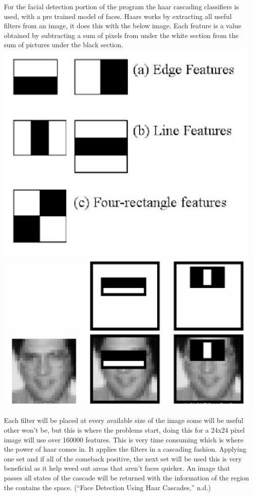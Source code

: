 \documentclass[
  english,
  a4paper,
,tablecaptionabove
]{scrartcl}
\begin{document}
For the facial detection portion of the program the haar cascading
classifiers is used, with a pre trained model of faces. Haars works by
extracting all useful filters from an image, it does this with the below
image. Each feature is a value obtained by subtracting a sum of pixels
from under the white section from the sum of pictures under the black
section. \includegraphics{images/ppm-images/camera-algorithm1.png}
\includegraphics{images/ppm-images/camera-algorithm2.png}

Each filter will be placed at every available size of the image some
will be useful other won't be, but this is where the problems start,
doing this for a 24x24 pixel image will use over 160000 features. This
is very time consuming which is where the power of haar comes in. It
applies the filters in a cascading fashion. Applying one set and if all
of the comeback positive, the next set will be used this is very
beneficial as it help weed out areas that aren't faces quicker. An image
that passes all states of the cascade will be returned with the
information of the region the contains the space. (``Face Detection
Using Haar Cascades,'' n.d.)
\end{document}
